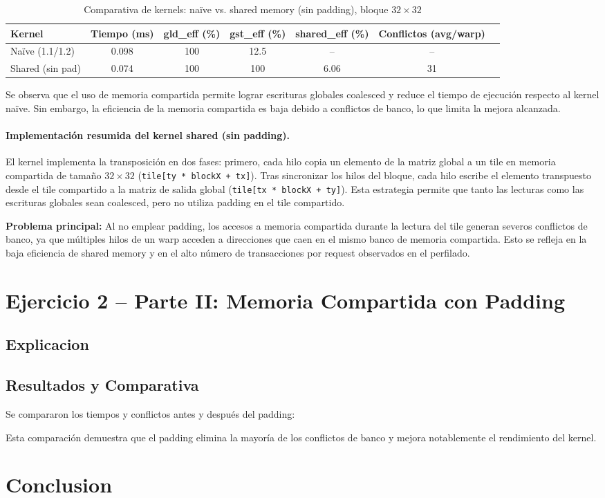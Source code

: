 \documentclass[a4paper,11pt]{article}
\begin{document}
\begin{table}[H]
\centering
\caption{Comparativa de kernels: naïve vs. shared memory (sin padding), bloque $32\times32$}
\begin{tabular}{lcccccc}
\toprule
Kernel & Tiempo (ms) & gld\_eff (\%) & gst\_eff (\%) & shared\_eff (\%) & Conflictos (avg/warp) \\
\midrule
Naïve (1.1/1.2) & 0.098 & 100 & 12.5 & -- & -- \\
Shared (sin pad) & 0.074 & 100 & 100 & 6.06 & 31 \\
\bottomrule
\end{tabular}
\end{table}

Se observa que el uso de memoria compartida permite lograr escrituras globales coalesced y reduce el tiempo de ejecución respecto al kernel naïve. Sin embargo, la eficiencia de la memoria compartida es baja debido a conflictos de banco, lo que limita la mejora alcanzada.


\paragraph{Implementación resumida del kernel shared (sin padding).}
El kernel implementa la transposición en dos fases: primero, cada hilo copia un elemento de la matriz global a un tile en memoria compartida de tamaño $32\times32$ (\texttt{tile[ty * blockX + tx]}). Tras sincronizar los hilos del bloque, cada hilo escribe el elemento transpuesto desde el tile compartido a la matriz de salida global (\texttt{tile[tx * blockX + ty]}). Esta estrategia permite que tanto las lecturas como las escrituras globales sean coalesced, pero no utiliza padding en el tile compartido.

\textbf{Problema principal:} Al no emplear padding, los accesos a memoria compartida durante la lectura del tile generan severos conflictos de banco, ya que múltiples hilos de un warp acceden a direcciones que caen en el mismo banco de memoria compartida. Esto se refleja en la baja eficiencia de shared memory y en el alto número de transacciones por request observados en el perfilado.

\section{Ejercicio 2 – Parte II: Memoria Compartida con Padding}

\subsection{Explicacion}

\subsection{Resultados y Comparativa}
Se compararon los tiempos y conflictos antes y después del padding:

Esta comparación demuestra que el padding elimina la mayoría de los conflictos de banco y mejora notablemente el rendimiento del kernel.


\section{Conclusion}
\end{document}
